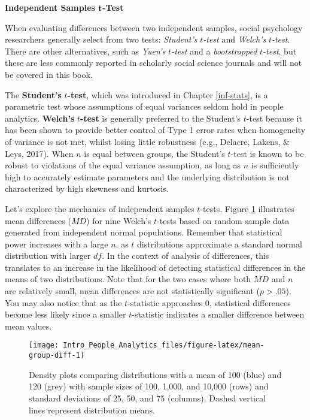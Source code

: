 \documentclass[
]{book}
\begin{document}
\textbf{Independent Samples }\(\textbf t\)\textbf{-Test}

When evaluating differences between two independent samples, social psychology researchers generally select from two tests: \emph{Student's} \(t\)\emph{-test} and \emph{Welch's} \(t\)\emph{-test}. There are other alternatives, such as \emph{Yuen's} \(t\)\emph{-test} and a \emph{bootstrapped} \(t\)\emph{-test}, but these are less commonly reported in scholarly social science journals and will not be covered in this book.

The \textbf{Student's} \(t\)\textbf{-test}, which was introduced in Chapter \ref{inf-stats}, is a parametric test whose assumptions of equal variances seldom hold in people analytics. \textbf{Welch's} \(t\)\textbf{-test} is generally preferred to the Student's \(t\)-test because it has been shown to provide better control of Type 1 error rates when homogeneity of variance is not met, whilst losing little robustness (e.g., Delacre, Lakens, \& Leys, 2017). When \(n\) is equal between groups, the Student's \(t\)-test is known to be robust to violations of the equal variance assumption, as long as \(n\) is sufficiently high to accurately estimate parameters and the underlying distribution is not characterized by high skewness and kurtosis.

Let's explore the mechanics of independent samples \(t\)-tests. Figure \ref{fig:mean-group-diff} illustrates mean differences (\(MD\)) for nine Welch's \(t\)-tests based on random sample data generated from independent normal populations. Remember that statistical power increases with a large \(n\), as \(t\) distributions approximate a standard normal distribution with larger \(df\). In the context of analysis of differences, this translates to an increase in the likelihood of detecting statistical differences in the means of two distributions. Note that for the two cases where both \(MD\) and \(n\) are relatively small, mean differences are not statistically significant (\(p > .05\)). You may also notice that as the \(t\)-statistic approaches 0, statistical differences become less likely since a smaller \(t\)-statistic indicates a smaller difference between mean values.

\begin{figure}

{\centering \texttt{[image: Intro\_People\_Analytics\_files/figure-latex/mean-group-diff-1]} 

}

\caption{Density plots comparing distributions with a mean of 100 (blue) and 120 (grey) with sample sizes of 100, 1,000, and 10,000 (rows) and standard deviations of 25, 50, and 75 (columns). Dashed vertical lines represent distribution means.}\label{fig:mean-group-diff}
\end{figure}
\end{document}
